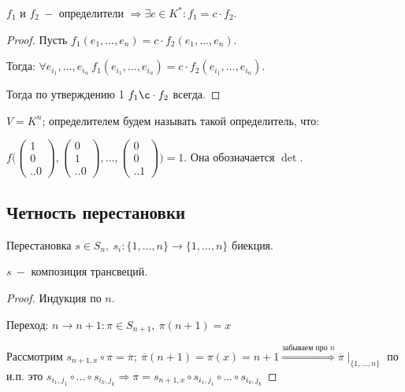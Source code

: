 \begin{theorem}
    $f_1$ и $f_2\ -$ определители $\Rightarrow \exists c\in K^*:f_1=c\cdot f_2$.
\end{theorem}

\begin{proof}
    Пусть $f_1(e_1,...,e_n)=c\cdot f_2(e_1,...,e_n)$.

    Тогда: $\forall e_{i_1},...,e_{i_n}\ f_1(e_{i_1},...,e_{i_n})= c\cdot f_2(e_{i_1},...,e_{i_n})$.

    Тогда по утверждению 1 $f_1\c\cdot f_2$ всегда.
\end{proof}

\begin{definition}
    $V=K^n$; определителем будем называть такой определитель, что:

    $f\bigg(\begin{pmatrix}
                1 \\ 0 \\ .. 0
    \end{pmatrix}, \begin{pmatrix}
                       0 \\ 1 \\ .. 0
    \end{pmatrix}, ..., \begin{pmatrix}
                            0 \\ 0 \\ .. 1
    \end{pmatrix} \bigg)=1$. Она обозначается $\det$.
\end{definition}


\subsection{Четность перестановки}
\begin{definition}
    Перестановка $s\in S_n,\ s_i:\{1,...,n\}\rightarrow \{1,...,n\}$ биекция.
\end{definition}

\begin{statement}
    $s\ -$ композиция трансвеций.
\end{statement}

\begin{proof}
    Индукция по $n$.

    Переход: $n\rightarrow n + 1:\pi\in S_{n+1},\ \pi(n+1)=x$

    Рассмотрим $s_{n+1, x}\circ \pi=\overline{\pi};\ \overline{\pi}(n+1)=\pi(x)=n+1\overset{\text{забываем про $n$}}{\Rightarrow}\overline{\pi}\mid_{\{1,...,n\}}$ по и.п. это $s_{i_1,j_1}\circ...\circ s_{i_k,j_k}\Rightarrow \pi = s_{n+1,x}\circ s_{i_1,j_1}\circ...\circ s_{i_k, j_k}$
\end{proof}

